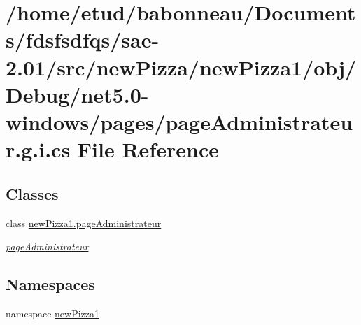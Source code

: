 \hypertarget{net5_80-windows_2pages_2pageAdministrateur_8g_8i_8cs}{}\section{/home/etud/babonneau/\+Documents/fdsfsdfqs/sae-\/2.01/src/new\+Pizza/new\+Pizza1/obj/\+Debug/net5.0-\/windows/pages/page\+Administrateur.g.\+i.\+cs File Reference}
\label{net5_80-windows_2pages_2pageAdministrateur_8g_8i_8cs}
\subsection*{Classes}
\begin{DoxyCompactItemize}
\item 
class \hyperlink{classnewPizza1_1_1pageAdministrateur}{new\+Pizza1.\+page\+Administrateur}
\begin{DoxyCompactList}\small\item\em \hyperlink{classnewPizza1_1_1pageAdministrateur}{page\+Administrateur} \end{DoxyCompactList}\end{DoxyCompactItemize}
\subsection*{Namespaces}
\begin{DoxyCompactItemize}
\item 
namespace \hyperlink{namespacenewPizza1}{new\+Pizza1}
\end{DoxyCompactItemize}
